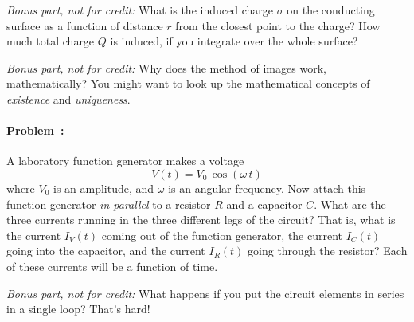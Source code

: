 \documentclass[12pt]{article}
\begin{document}
\textsl{Bonus part, not for credit:} What is the induced charge
$\sigma$ on the conducting surface as a function of distance $r$ from
the closest point to the charge? How much total charge $Q$ is induced, if
you integrate over the whole surface?

\textsl{Bonus part, not for credit:} Why does the method of images work,
mathematically? You might want to look up the mathematical concepts of
\emph{existence} and \emph{uniqueness}.

\paragraph{Problem~\theproblem:}%
A laboratory function generator makes a voltage
\begin{equation}
V(t) = V_0\,\cos(\omega\,t)
\end{equation}
where $V_0$ is an amplitude, and $\omega$ is an angular frequency. Now
attach this function generator \emph{in parallel} to a resistor $R$ and
a capacitor $C$. What are the three currents running in the three different
legs of the circuit? That is, what is the current $I_V(t)$ coming out of the function
generator, the current $I_C(t)$ going into the capacitor, and the current $I_R(t)$ going
through the resistor? Each of these currents will be a function of time.

\textsl{Bonus part, not for credit:} What happens if you put the circuit
elements in series in a single loop? That's hard!
\end{document}
